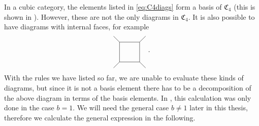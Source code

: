 In a cubic category, the elements listed in \cref{eq:C4diags} form a basis of $\mathfrak{C}_4$ (this is shown in \cite[Proposition 4.16]{Morrison2017}). However, these are not the only diagrams in $\mathfrak{C}_4$. It is also possible to have diagrams with internal faces, for example
	\begin{equation}
	\label{eq:square}
		\begin{tikzpicture}[baseline=(current bounding box.center)]
			\draw (0,0) rectangle (1,1);
			\draw (0,0) -- (-0.3,-0.3);
			\draw (0,1) -- (-0.3,1.3);
			\draw (1,0) -- (1.3,-0.3);
			\draw (1,1) -- (1.3,1.3);
		\end{tikzpicture}\ .
	\end{equation}
With the rules we have listed so far, we are unable to evaluate these kinds of diagrams, but since it is not a basis element there has to be a decomposition of the above diagram in terms of the basis elements. In \cite{Morrison2017}, this calculation was only done in the case $b=1$. We will need the general case $b\neq 1$ later in this thesis, therefore we calculate the general expression in the following. 

